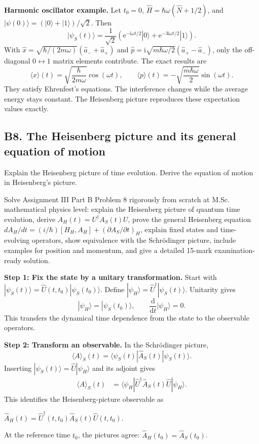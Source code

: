 \documentclass[11pt,a4paper]{article}
\newcommand{\key}[1]{\begin{resultbox}\centering\(\displaystyle #1\)\end{resultbox}}
\newcommand{\dd}{\mathrm{d}}\newcommand{\iu}{\mathrm{i}}\newcommand{\ee}{\mathrm{e}}
\newcommand{\avg}[1]{\langle #1\rangle}\newcommand{\Sch}{Schr\"odinger}
\newcommand{\bra}[1]{\langle #1|}\newcommand{\ket}[1]{|#1\rangle}
\begin{document}
\textbf{Harmonic oscillator example.} Let \(t_0=0\), \(\hat H=\hbar\omega(\hat N+1/2)\), and \(\ket{\psi(0)}=(\ket0+\ket1)/\sqrt2\). Then
\begin{equation}\boxed{\ket{\psi_S(t)}=\frac1{\sqrt2}\left(\ee^{-\iu\omega t/2}\ket0+\ee^{-3\iu\omega t/2}\ket1\right).}\end{equation}
With \(\hat x=\sqrt{\hbar/(2m\omega)}(\hat a_-+\hat a_+)\) and \(\hat p=\iu\sqrt{m\hbar\omega/2}(\hat a_+-\hat a_-)\), only the off-diagonal \(0\leftrightarrow1\) matrix elements contribute. The exact results are
\begin{equation}
\boxed{\avg{x}(t)=\sqrt{\frac{\hbar}{2m\omega}}\cos(\omega t),\qquad
\avg p(t)=-\sqrt{\frac{m\hbar\omega}{2}}\sin(\omega t).}
\end{equation}
They satisfy Ehrenfest's equations. The interference changes while the average energy stays constant. The Heisenberg picture reproduces these expectation values exactly.

\subsection{B8. The Heisenberg picture and its general equation of motion}
\begin{questionbox}
Explain the Heisenberg picture of time evolution. Derive the equation of motion in Heisenberg's picture.
\end{questionbox}
\begin{studybox}
Solve Assignment III Part B Problem 8 rigorously from scratch at M.Sc. mathematical physics level: explain the Heisenberg picture of quantum time evolution, derive \(A_H(t)=U^\dagger A_S(t)U\), prove the general Heisenberg equation \(dA_H/dt=(i/\hbar)[H_H,A_H]+(\partial A_S/\partial t)_H\), explain fixed states and time-evolving operators, show equivalence with the Schr\"odinger picture, include examples for position and momentum, and give a detailed 15-mark examination-ready solution.
\end{studybox}
\textbf{Step 1: Fix the state by a unitary transformation.} Start with \(\ket{\psi_S(t)}=\hat U(t,t_0)\ket{\psi_S(t_0)}\). Define \(\ket{\psi_H}=\hat U^\dagger\ket{\psi_S(t)}\). Unitarity gives
\begin{equation}\boxed{\ket{\psi_H}=\ket{\psi_S(t_0)},\qquad\frac{\dd}{\dd t}\ket{\psi_H}=0.}\end{equation}
This transfers the dynamical time dependence from the state to the observable operators.

\textbf{Step 2: Transform an observable.} In the Schr\"odinger picture,
\begin{equation}\avg A_S(t)=\bra{\psi_S(t)}\hat A_S(t)\ket{\psi_S(t)}.\end{equation}
Inserting \(\ket{\psi_S(t)}=\hat U\ket{\psi_H}\) and its adjoint gives
\begin{align}\avg A_S(t)&=\bra{\psi_H}\hat U^\dagger\hat A_S(t)\hat U\ket{\psi_H}.\end{align}
This identifies the Heisenberg-picture observable as
\key{\boxed{\hat A_H(t)=\hat U^\dagger(t,t_0)\hat A_S(t)\hat U(t,t_0).}}
At the reference time \(t_0\), the pictures agree: \(\hat A_H(t_0)=\hat A_S(t_0)\).
\end{document}

